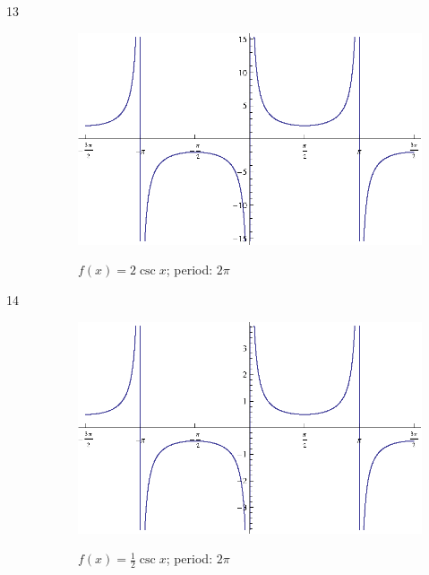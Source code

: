 \documentclass{exam}
\begin{document}
\begin{description}
      \item[13]
        \begin{figure}[H]
          \centering
          \includegraphics[scale=0.9]{exercise13.eps}

          $f(x) = 2 \csc x$; period: $2 \pi$
        \end{figure}

      \item[14]
        \begin{figure}[H]
          \centering
          \includegraphics[scale=0.9]{exercise14.eps}

          $f(x) = \frac{1}{2} \csc x$; period: $2 \pi$
        \end{figure}


\end{description}
\end{document}

